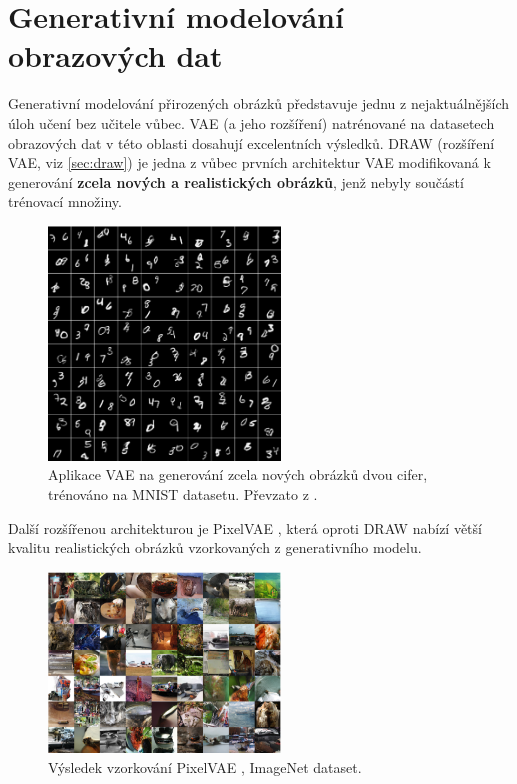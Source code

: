 \section{Generativní modelování obrazových dat}
\label{sec:applications_generative_modeling}
Generativní modelování přirozených obrázků představuje jednu z nejaktuálnějších úloh učení bez učitele vůbec. \cite{Gulrajani2016}
VAE (a jeho rozšíření) natrénované na datasetech obrazových dat v této oblasti dosahují excelentních výsledků.
DRAW (rozšíření VAE, viz \autoref{sec:draw}) je jedna z vůbec prvních architektur VAE modifikovaná k generování \textbf{zcela nových a realistických obrázků}, jenž nebyly součástí trénovací množiny.
\begin{figure}[H]
    \centering
    \includegraphics[width=0.55\textwidth]{figures/applications/mnist_double_digits_gregor.png}
    \caption{Aplikace VAE na generování zcela nových obrázků dvou cifer, trénováno na MNIST datasetu. Převzato z \cite{Gregor2015}.}
    \label{fig:mnist_double_digits_gregor}
\end{figure}

Další rozšířenou architekturou je PixelVAE \cite{Gulrajani2016}, která oproti DRAW nabízí větší kvalitu realistických obrázků vzorkovaných z generativního modelu.

\begin{figure}[H]
    \centering
    \includegraphics[width=0.55\textwidth]{figures/applications/image_net_pixel_vae_gulrajani.png}
    \caption{Výsledek vzorkování PixelVAE \cite{Gulrajani2016}, ImageNet dataset.}
    \label{fig:image_net_pixel_vae_gulrajani}
\end{figure}

